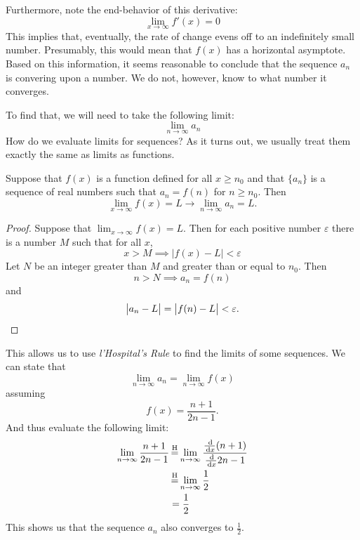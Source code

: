 \begin{ex}
    Furthermore, note the end-behavior of this derivative:
    \[ \lim_{x \to \infty} f'(x) = 0 \]
    This implies that, eventually, the rate of change evens off to an indefinitely small number.
    Presumably, this would mean that \(f(x)\) has a horizontal asymptote.
    Based on this information, it seems reasonable to conclude that the sequence \(a_n\) is convering upon a number.
    We do not, however, know to what number it converges.

    To find that, we will need to take the following limit:
    \[ \lim_{n\to\infty} a_n \]
    How do we evaluate limits for sequences? As it turns out, we usually treat
    them exactly the same as limits as functions.
    \begin{theorem}\label{inftyanlimit}
      Suppose that \(f(x)\) is a function defined for all \( x \geq n_0\) and
      that \( \{a_n\} \) is a sequence of real numbers such that \(a_n = f(n)\)
      for \(n \geq n_0\). Then
      \[ \lim_{x \to \infty} f(x) = L \to \lim_{n \to \infty} a_n = L\text{.} \]
      \begin{proof}
        Suppose that \( \lim_{x \to \infty} f(x) = L \). Then for each positive
        number \( \varepsilon \) there is a number \( M \) such that for all
        \(x\),
        \[ x > M \implies \big| f(x) - L \big| < \varepsilon \]
        Let \(N\) be an integer greater than \(M\) and greater than or equal to
        \(n_0\). Then
        \[ n > N \implies a_n = f(n)\]
        and
        \[\big|a_n -L \big| = \big|f(n) - L\big| < \varepsilon\text{.} \qedhere\]
        \cite[p. 537]{thomas}%
      \end{proof}
    \end{theorem}
    This allows us to use \emph{l'Hospital's Rule} to find the limits of some
    sequences. We can state that
    \[\lim_{n\to\infty} a_n =\lim_{n\to\infty}f(x)\]
    assuming
    \[f(x)=\frac{n+1}{2n-1}\text{.}\]
    And thus evaluate the following limit:
    \begin{align*}
      \lim_{n\to\infty} \frac{n+1}{2n-1}
      &\=H \lim_{n\to\infty} \dfrac{\frac{\ud}{\ud x}(n+1)}{\frac{\ud}{\ud x}2n-1} \\
      &\=H \lim_{n\to\infty} \frac{1}{2} \\
      &= \frac{1}{2}
    \end{align*}
    This shows us that the sequence $a_n$ also converges to \(\frac{1}{2}\).
    \begin{figure}[H]
      \begin{center}

\end{center}
\end{figure}
\end{ex}
